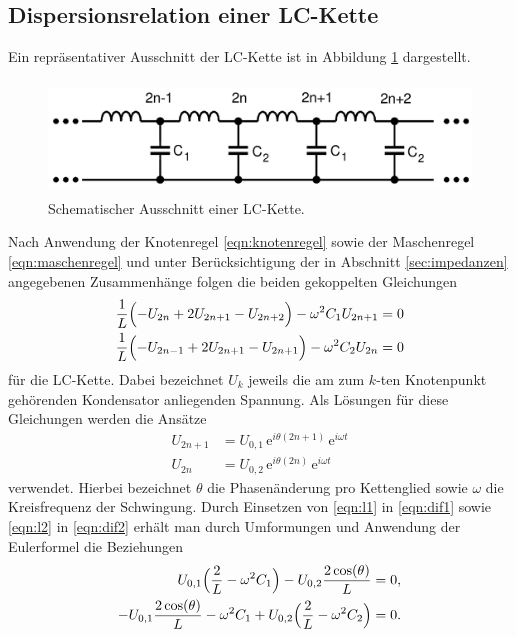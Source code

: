 \subsection{Dispersionsrelation einer LC-Kette}
Ein repräsentativer Ausschnitt der LC-Kette ist in Abbildung \ref{tfig:1} dargestellt.
\begin{figure}[H]
  \centering
  \includegraphics[height=3cm]{theorie_1.png}
  \caption{Schematischer Ausschnitt einer LC-Kette.}
  \label{tfig:1}
\end{figure}
Nach Anwendung der Knotenregel \eqref{eqn:knotenregel} sowie der Maschenregel \eqref{eqn:maschenregel} und unter Berücksichtigung der in Abschnitt \ref{sec:impedanzen} angegebenen Zusammenhänge folgen die beiden gekoppelten Gleichungen
\begin{align}
  \label{eqn:dif1}
  \frac{1}{L} \Bigl( -U_{2n} + 2 U_{2n+1} - U_{2n+2} \Bigr) - \omega^2 C_1 U_{2n+1} &= 0 \\
  \label{eqn:dif2}
  \frac{1}{L} \Bigl( -U_{2n-1} + 2 U_{2n+1} - U_{2n+1} \Bigr) - \omega^2 C_2 U_{2n} &= 0
\end{align}
für die LC-Kette.
Dabei bezeichnet $U_k$ jeweils die am zum $k$-ten Knotenpunkt gehörenden Kondensator anliegenden Spannung.
Als Lösungen für diese Gleichungen werden die Ansätze
\begin{align}
  \label{eqn:l1}
U_{2n+1} &= U_{0,1} \, \mathrm{e}^{i \theta (2n+1)} \, \mathrm{e}^{ i \omega t} \\
  \label{eqn:l2}
U_{2n} &= U_{0,2} \, \mathrm{e}^{i \theta (2n)} \, \mathrm{e}^{ i \omega t}
\end{align}
verwendet.
Hierbei bezeichnet $\theta$ die Phasenänderung pro Kettenglied sowie $\omega$ die Kreisfrequenz der Schwingung.
Durch Einsetzen von \eqref{eqn:l1} in \eqref{eqn:dif1} sowie \eqref{eqn:l2} in \eqref{eqn:dif2} erhält man durch Umformungen und Anwendung der Eulerformel die Beziehungen
\begin{align}
U_{0,1} \Bigl( \frac{2}{L} - \omega^2 C_1  \Bigr) - U_{0,2} \frac{2 \cos (\theta)}{L} &= 0, \\
-U_{0,1} \frac{2 \cos (\theta)}{L} - \omega^2 C_1 + U_{0,2} \Bigl( \frac{2}{L} - \omega^2 C_2  \Bigr)  &= 0.
\end{align}
